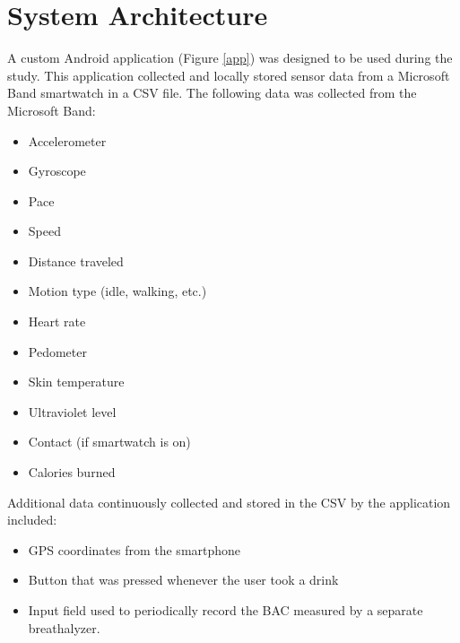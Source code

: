 \section{System Architecture}
A custom Android application (Figure \ref{app}) was designed to be used during the study. This application collected and locally stored sensor data from a Microsoft Band smartwatch in a CSV file. The following data was collected from the Microsoft Band:
\begin{itemize}
	\item Accelerometer
	\item Gyroscope
	\item Pace
	\item Speed
	\item Distance traveled
	\item Motion type (idle, walking, etc.)
	\item Heart rate
	\item Pedometer
	\item Skin temperature
	\item Ultraviolet level
	\item Contact (if smartwatch is on)
	\item Calories burned
\end{itemize}
Additional data continuously collected and stored in the CSV by the application included:
\begin{itemize}
	\item GPS coordinates from the smartphone 
	\item Button that was pressed whenever the user took a drink
	\item Input field used to periodically record the BAC measured by a separate breathalyzer.
\end{itemize} 

